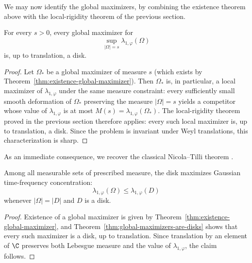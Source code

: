 We may now identify the global maximizers, by combining the existence theorem
above with the local-rigidity theorem of the previous section.

\begin{theorem}\label{thm:global-maximizers-are-disks}
For every \(s>0\), every global maximizer for
\[
\sup_{|\Omega|=s}\lambda_{1,\varphi}(\Omega)
\]
is, up to translation, a disk.
\end{theorem}

\begin{proof}
Let \(\Omega_*\) be a global maximizer of measure \(s\) (which exists by
Theorem~\ref{thm:existence-global-maximizer}). Then \(\Omega_*\) is, in
particular, a local maximizer of \(\lambda_{1,\varphi}\) under the same
measure constraint: every sufficiently small smooth deformation of
\(\Omega_*\) preserving the measure \(|\Omega|=s\) yields a competitor
whose value of \(\lambda_{1,\varphi}\) is at most
\(M(s)=\lambda_{1,\varphi}(\Omega_*)\). The local-rigidity theorem proved in
the previous section therefore applies: every such local maximizer is, up
to translation, a disk. Since the problem is invariant under Weyl
translations, this characterization is sharp.
\end{proof}

As an immediate consequence, we recover the classical Nicola--Tilli theorem
\cite{Nicola-Tilli, Nicola-Tilli-2}.

\begin{corollary}
Among all measurable sets of prescribed measure, the disk maximizes Gaussian
time-frequency concentration:
\[
\lambda_{1,\varphi}(\Omega)\le \lambda_{1,\varphi}(D)
\]
whenever \(|\Omega|=|D|\) and \(D\) is a disk.
\end{corollary}

\begin{proof}
Existence of a global maximizer is given by
Theorem~\ref{thm:existence-global-maximizer}, and
Theorem~\ref{thm:global-maximizers-are-disks} shows that every such
maximizer is a disk, up to translation. Since translation by an element of
\(\C\) preserves both Lebesgue measure and the value of
\(\lambda_{1,\varphi}\), the claim follows.
\end{proof}


